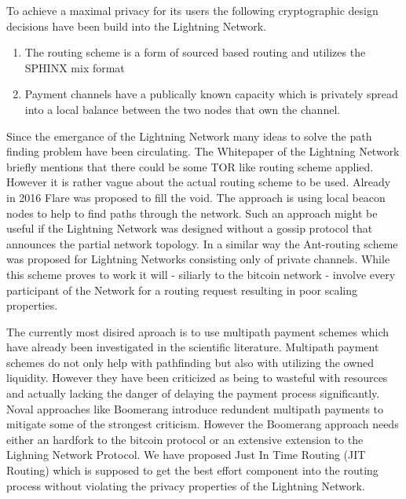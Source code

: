 \documentclass[a4paper]{paper}
\begin{document}
To achieve a maximal privacy for its users the following cryptographic design decisions have been build into the Lightning Network.
\begin{enumerate}
\item The routing scheme is a form of sourced based routing and utilizes the SPHINX mix format \cite{danezis2009sphinx}
\item Payment channels have a publically known capacity which is privately spread into a local balance between the two nodes that own the channel.
\end{enumerate}

Since the emergance of the Lightning Network many ideas to solve the path finding problem have been circulating.
The Whitepaper of the Lightning Network \cite{poon2016bitcoin} briefly mentions that there could be some TOR like routing scheme applied.
However it is rather vague about the actual routing scheme to be used.
Already in 2016 Flare \cite{prihodko2016flare} was proposed to fill the void.
The approach is using local beacon nodes to help to find paths through the network.
Such an approach might be useful if the Lightning Network was designed without a gossip protocol that announces the partial network topology.
In a similar way the Ant-routing scheme \cite{grunspan2018ant} was proposed for Lightning Networks consisting only of private channels.
While this scheme proves to work it will - siliarly to the bitcoin network - involve every participant of the Network for a routing request resulting in poor scaling properties.

The currently most disired aproach is to use multipath payment schemes \cite{osuntokun2018AMP} which have already been investigated \cite{piatkivskyi2018split} in the scientific literature.
Multipath payment schemes do not only help with pathfinding but also with utilizing the owned liquidity.
However they have been criticized \cite{pickhardt2019pathfinding} as being to wasteful with resources and actually lacking the danger of delaying the payment process significantly.
Noval approaches like Boomerang \cite{bagaria2019boomerang} introduce redundent multipath payments to mitigate some of the strongest criticism.
However the Boomerang approach needs either an hardfork to the bitcoin protocol or an extensive extension to the Lighning Network Protocol. 
We have proposed Just In Time Routing (JIT Routing) \cite{pickhardt2019jit} which is supposed to get the best effort component into the routing process without violating the privacy properties of the Lightning Network.
\end{document}
